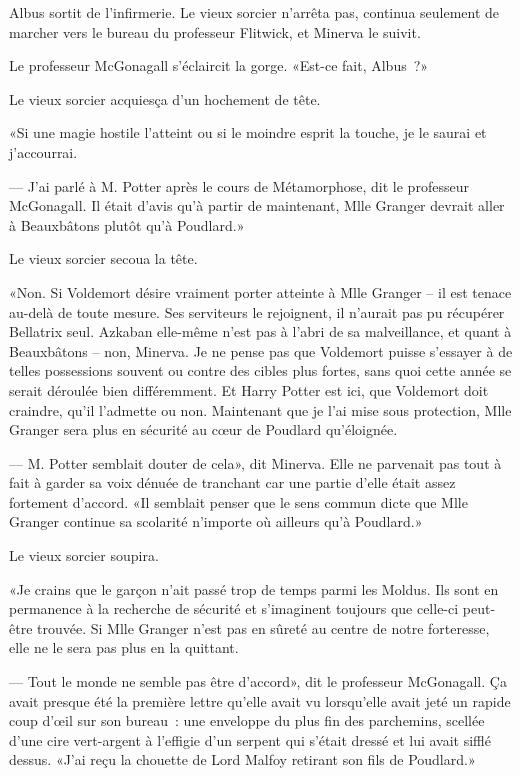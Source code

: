 Albus sortit de l'infirmerie. Le vieux sorcier n'arrêta pas, continua seulement de marcher vers le bureau du professeur Flitwick, et Minerva le suivit.

Le professeur McGonagall s'éclaircit la gorge. «Est-ce fait, Albus~?»

Le vieux sorcier acquiesça d'un hochement de tête.

«Si une magie hostile l'atteint ou si le moindre esprit la touche, je le saurai et j'accourrai.

--- J'ai parlé à M. Potter après le cours de Métamorphose, dit le professeur McGonagall. Il était d'avis qu'à partir de maintenant, Mlle Granger devrait aller à Beauxbâtons plutôt qu'à Poudlard.»

Le vieux sorcier secoua la tête.

«Non. Si Voldemort désire vraiment porter atteinte à Mlle Granger -- il est tenace au-delà de toute mesure. Ses serviteurs le rejoignent, il n'aurait pas pu récupérer Bellatrix seul. Azkaban elle-même n'est pas à l'abri de sa malveillance, et quant à Beauxbâtons -- non, Minerva. Je ne pense pas que Voldemort puisse s'essayer à de telles possessions souvent ou contre des cibles plus fortes, sans quoi cette année se serait déroulée bien différemment. Et Harry Potter est ici, que Voldemort doit craindre, qu'il l'admette ou non. Maintenant que je l'ai mise sous protection, Mlle Granger sera plus en sécurité au cœur de Poudlard qu'éloignée.

--- M. Potter semblait douter de cela», dit Minerva. Elle ne parvenait pas tout à fait à garder sa voix dénuée de tranchant car une partie d'elle était assez fortement d'accord. «Il semblait penser que le sens commun dicte que Mlle Granger continue sa scolarité n'importe où ailleurs qu'à Poudlard.»

Le vieux sorcier soupira.

«Je crains que le garçon n'ait passé trop de temps parmi les Moldus. Ils sont en permanence à la recherche de sécurité et s'imaginent toujours que celle-ci peut-être trouvée. Si Mlle Granger n'est pas en sûreté au centre de notre forteresse, elle ne le sera pas plus en la quittant.

--- Tout le monde ne semble pas être d'accord», dit le professeur McGonagall. Ça avait presque été la première lettre qu'elle avait vu lorsqu'elle avait jeté un rapide coup d'œil sur son bureau~: une enveloppe du plus fin des parchemins, scellée d'une cire vert-argent à l'effigie d'un serpent qui s'était dressé et lui avait sifflé dessus. «J'ai reçu la chouette de Lord Malfoy retirant son fils de Poudlard.»

